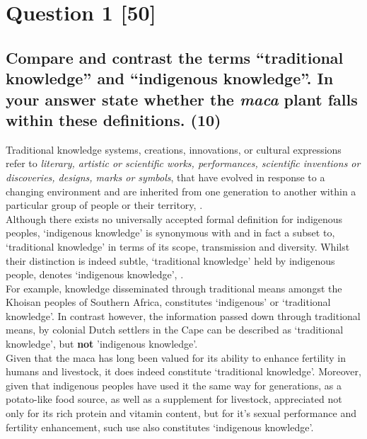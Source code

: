 \documentclass[11pt]{article}
\begin{document}
\section{Question 1 [50]}
\label{sec:org4937799}

\subsection{Compare and contrast the terms ``traditional knowledge'' and ``indigenous knowledge''. In your answer state whether the \emph{maca} plant falls within these definitions. (10)}
\label{sec:orge906167}
Traditional knowledge systems, creations, innovations, or cultural expressions
refer to \emph{literary, artistic or scientific works, performances, scientific
inventions or discoveries, designs, marks or symbols}, that have evolved in
response to a changing environment and are inherited from one generation to
another within a particular group of people or their territory, \cite{geyer10_towards_clearer_defin_underst_indi}.\\

Although there exists no universally accepted formal definition for indigenous
peoples, `indigenous knowledge' is synonymous with and in fact a subset to,
`traditional knowledge' in terms of its scope, transmission and diversity.
Whilst their distinction is indeed subtle, `traditional knowledge' held by
indigenous people, denotes `indigenous knowledge', \cite{masango10_indigenous_trad_knowl_protect_prospects,amechi15_trad_knowl_medical_uses_plants_pat_sa}.\\

For example, knowledge disseminated through traditional means amongst the
Khoisan peoples of Southern Africa, constitutes `indigenous' or `traditional
knowledge'. In contrast however, the information passed down through traditional
means, by colonial Dutch settlers in the Cape can be described as `traditional
knowledge', but \textbf{not} 'indigenous knowledge'.\\

Given that the maca has long been valued for its ability to enhance fertility in
humans and livestock, it does indeed constitute `traditional knowledge'.
Moreover, given that indigenous peoples have used it the same way for
generations, as a potato-like food source, as well as a supplement for
livestock, appreciated not only for its rich protein and vitamin content, but
for it's sexual performance and fertility enhancement, such use also constitutes
`indigenous knowledge'.
\end{document}
